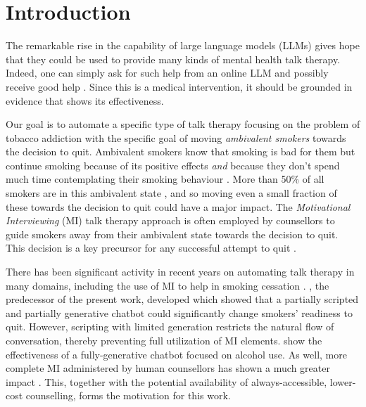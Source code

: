 \section{Introduction} \label{section:introduction}
The remarkable rise in the capability of large language models (LLMs) gives hope that they could be used to provide many kinds of mental health talk therapy. Indeed, one can simply ask for such help from an online LLM and possibly receive good help \citep{Siddals2024}.  Since this is a medical intervention, it should be grounded in evidence that shows its effectiveness.

Our goal is to automate a specific type of talk therapy focusing on the problem of tobacco addiction with the specific goal of moving \emph{ambivalent smokers} towards the decision to quit. Ambivalent smokers know that smoking is bad for them but continue smoking because of its positive effects \emph{and} because they don't spend much time contemplating their smoking behaviour \citep{miller1983motivational,rollnick1997helping,MillerRollnick2023}.  More than 50\% of all smokers are in this ambivalent state \cite{Babb2017}, and so moving even a small fraction of these towards the decision to quit could have a major impact. The \emph{Motivational Interviewing} (MI) talk therapy approach \citep{MillerRollnick2023} is often employed by counsellors to guide smokers away from their ambivalent state towards the decision to quit. This decision is a key precursor for any successful attempt to quit \citep{West2006}.

There has been significant activity in recent years on automating talk therapy in many domains, including the use of MI to help in smoking cessation \citep{10.1145/3652988.3673932,basar-etal-2024-extent,welivita-pu-2023-boosting,info:doi/10.2196/49132}. \citet{info:doi/10.2196/49132}, the predecessor of the present work, developed \oldsysname which showed that a partially scripted and partially generative chatbot could significantly change smokers' readiness to quit. However, scripting with limited generation restricts the natural flow of conversation, thereby preventing full utilization  of MI elements. \citet{10.1145/3652988.3673932} show the effectiveness of a fully-generative chatbot focused on alcohol use. As well, more complete MI administered by human counsellors has shown a much greater impact \citep{Boudreaux2012}. This, together with the potential availability of always-accessible, lower-cost counselling, forms the motivation for this work.

